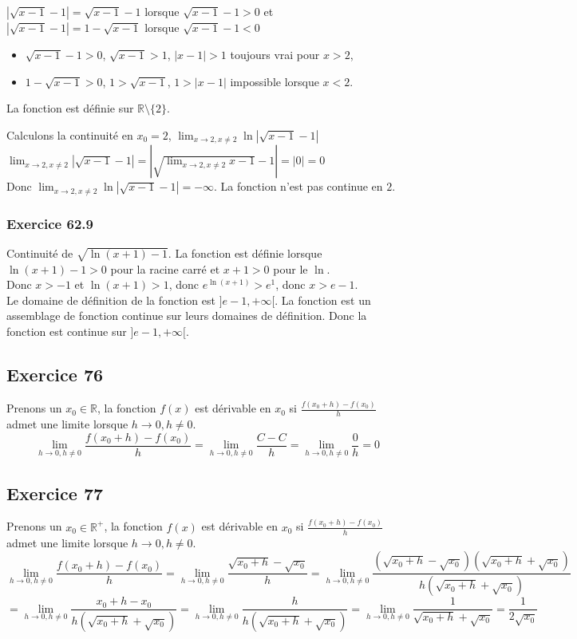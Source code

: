 \documentclass[]{book}
\theoremstyle{definition}
\newcommand{\bb}[1]{\mathbb{#1}}
\newcommand{\R}{\bb{R}}
\begin{document}
$|\sqrt{x-1}-1| = \sqrt{x-1}-1$ lorsque $\sqrt{x-1}-1 > 0$ et $|\sqrt{x-1}-1| = 1-\sqrt{x-1}$ lorsque $\sqrt{x-1}-1 < 0$

\begin{itemize}
\item $\sqrt{x-1}-1 > 0$, $\sqrt{x-1} > 1$, $|x-1| > 1$ toujours vrai pour $x > 2$, 
\item $1-\sqrt{x-1} > 0$, $1>\sqrt{x-1}$, $1 > |x-1|$ impossible lorsque $x<2$.
\end{itemize}

La fonction est d\'efinie sur $\R \setminus \{2\}$.

Calculons la continuit\'e en $x_0= 2$, $\lim_{x \to 2, x \neq 2} \ln|\sqrt{x-1}-1|$\\
$\lim_{x \to 2, x \neq 2} |\sqrt{x-1}-1| = |\sqrt{\lim_{x \to 2, x \neq 2}x-1}-1| = |0| = 0$\\
Donc $\lim_{x \to 2, x \neq 2} \ln|\sqrt{x-1}-1| = -\infty$. La fonction n'est pas continue en $2$.

\subsubsection*{Exercice 62.9}
Continuit\'e de $\sqrt{\ln(x+1)-1}$. La fonction est d\'efinie lorsque $\ln(x+1)-1 > 0$ pour la racine carr\'e et $x+1>0$ pour le $\ln$.\\
Donc $x>-1$ et $\ln(x+1) > 1$, donc $e^{\ln(x+1)} > e^1$, donc $x > e - 1$.\\

Le domaine de d\'efinition de la fonction est $]e-1, +\infty[$. La fonction est un assemblage de fonction continue sur leurs domaines de d\'efinition. Donc la fonction est continue sur $]e-1, +\infty[$.


\subsection*{Exercice 76}
Prenons un $x_0 \in \R$, la fonction $f(x)$ est d\'erivable en $x_0$ si $\frac{f(x_0+h)-f(x_0)}{h}$ admet une limite lorsque $h \to 0, h \neq 0$.
$$\lim_{h \to 0, h \neq 0} \frac{f(x_0+h)-f(x_0)}{h} = \lim_{h \to 0, h \neq 0} \frac{C-C}{h} = \lim_{h \to 0, h \neq 0} \frac{0}{h} = 0$$


\subsection*{Exercice 77}
Prenons un $x_0 \in \R^{+}$, la fonction $f(x)$ est d\'erivable en $x_0$ si $\frac{f(x_0+h)-f(x_0)}{h}$ admet une limite lorsque $h \to 0, h \neq 0$.
$$\lim_{h \to 0, h \neq 0} \frac{f(x_0+h)-f(x_0)}{h} = \lim_{h \to 0, h \neq 0} \frac{\sqrt{x_0+h}-\sqrt{x_0}}{h} = \lim_{h \to 0, h \neq 0} \frac{(\sqrt{x_0+h}-\sqrt{x_0})(\sqrt{x_0+h}+\sqrt{x_0})}{h(\sqrt{x_0+h}+\sqrt{x_0})}$$
$$= \lim_{h \to 0, h \neq 0} \frac{x_0+h-x_0}{h(\sqrt{x_0+h}+\sqrt{x_0})} = \lim_{h \to 0, h \neq 0} \frac{h}{h(\sqrt{x_0+h}+\sqrt{x_0})} = \lim_{h \to 0, h \neq 0} \frac{1}{\sqrt{x_0+h}+\sqrt{x_0}} = \frac{1}{2\sqrt{x_0}}$$
\end{document}
